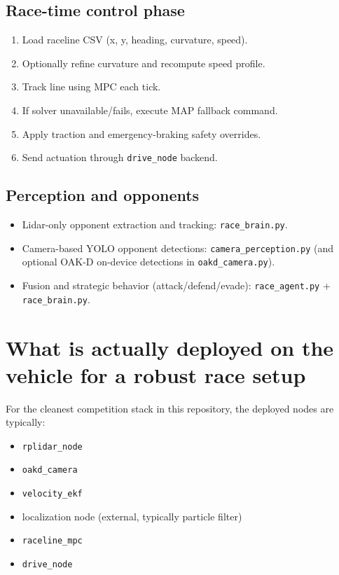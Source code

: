\documentclass[11pt]{article}
\begin{document}
\subsection{Race-time control phase}
\begin{enumerate}
  \item Load raceline CSV (x, y, heading, curvature, speed).
  \item Optionally refine curvature and recompute speed profile.
  \item Track line using MPC each tick.
  \item If solver unavailable/fails, execute MAP fallback command.
  \item Apply traction and emergency-braking safety overrides.
  \item Send actuation through \texttt{drive\_node} backend.
\end{enumerate}

\subsection{Perception and opponents}
\begin{itemize}
  \item Lidar-only opponent extraction and tracking: \texttt{race\_brain.py}.
  \item Camera-based YOLO opponent detections: \texttt{camera\_perception.py} (and optional OAK-D on-device detections in \texttt{oakd\_camera.py}).
  \item Fusion and strategic behavior (attack/defend/evade): \texttt{race\_agent.py} + \texttt{race\_brain.py}.
\end{itemize}

\section{What is actually deployed on the vehicle for a robust race setup}
For the cleanest competition stack in this repository, the deployed nodes are typically:
\begin{itemize}
  \item \texttt{rplidar\_node}
  \item \texttt{oakd\_camera}
  \item \texttt{velocity\_ekf}
  \item localization node (external, typically particle filter)
  \item \texttt{raceline\_mpc}
  \item \texttt{drive\_node}
\end{itemize}
\end{document}
